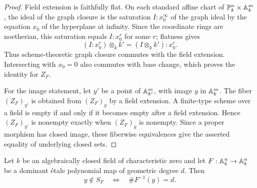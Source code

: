 \begin{proof}
Field extension is faithfully flat.  On each standard affine chart of
\(\mathbb P^n_k\times\mathbb A^m_k\), the ideal of the graph closure is the
saturation \(I:x_0^\infty\) of the graph ideal by the equation \(x_0\) of
the hyperplane at infinity.  Since the coordinate rings are noetherian, this
saturation equals \(I:x_0^r\) for some \(r\); flatness gives
\[
 (I:x_0^r)\otimes_k k'=(I\otimes_k k'):x_0^r.
\]
Thus scheme-theoretic graph closure commutes with the field extension.
Intersecting with \(x_0=0\) also commutes with base change, which proves the
identity for \(Z_F\).

For the image statement, let \(y'\) be a point of \(\mathbb A^m_{k'}\), with image
\(y\) in \(\mathbb A^m_k\).  The fiber \((Z_F)_{y'}\) is obtained from
\((Z_F)_y\) by a field extension.  A finite-type scheme over a field is
empty if and only if it becomes empty after a field extension.  Hence
\((Z_F)_{y'}\) is nonempty exactly when \((Z_F)_y\) is nonempty.  Since a
proper morphism has closed image, these fiberwise equivalences give the
asserted equality of underlying closed sets.
\end{proof}

\begin{lemma}
\label{lem:properness-cardinality}
Let \(k\) be an algebraically closed field of characteristic zero and let
\(F:\mathbb A^n_k\to\mathbb A^n_k\) be a dominant \'etale polynomial map of geometric
degree \(d\).  Then
\begin{equation}
 y\notin S_F\quad\Longleftrightarrow\quad
 \#F^{-1}(y)=d.
 \label{eq:properness-cardinality}
\end{equation}
\end{lemma}

